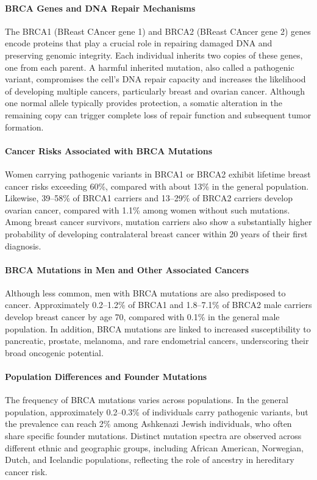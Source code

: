 \documentclass[10pt]{extarticle}
\begin{document}
\paragraph{BRCA Genes and DNA Repair Mechanisms}
The BRCA1 (BReast CAncer gene 1) and BRCA2 (BReast CAncer gene 2) genes encode proteins that play a crucial role in repairing damaged DNA and preserving genomic integrity. Each individual inherits two copies of these genes, one from each parent. A harmful inherited mutation, also called a pathogenic variant, compromises the cell’s DNA repair capacity and increases the likelihood of developing multiple cancers, particularly breast and ovarian cancer. Although one normal allele typically provides protection, a somatic alteration in the remaining copy can trigger complete loss of repair function and subsequent tumor formation.

\paragraph{Cancer Risks Associated with BRCA Mutations}
Women carrying pathogenic variants in BRCA1 or BRCA2 exhibit lifetime breast cancer risks exceeding 60\%, compared with about 13\% in the general population. Likewise, 39–58\% of BRCA1 carriers and 13–29\% of BRCA2 carriers develop ovarian cancer, compared with 1.1\% among women without such mutations. Among breast cancer survivors, mutation carriers also show a substantially higher probability of developing contralateral breast cancer within 20 years of their first diagnosis.

\paragraph{BRCA Mutations in Men and Other Associated Cancers}
Although less common, men with BRCA mutations are also predisposed to cancer. Approximately 0.2–1.2\% of BRCA1 and 1.8–7.1\% of BRCA2 male carriers develop breast cancer by age 70, compared with 0.1\% in the general male population. In addition, BRCA mutations are linked to increased susceptibility to pancreatic, prostate, melanoma, and rare endometrial cancers, underscoring their broad oncogenic potential.

\paragraph{Population Differences and Founder Mutations}
The frequency of BRCA mutations varies across populations. In the general population, approximately 0.2–0.3\% of individuals carry pathogenic variants, but the prevalence can reach 2\% among Ashkenazi Jewish individuals, who often share specific founder mutations. Distinct mutation spectra are observed across different ethnic and geographic groups, including African American, Norwegian, Dutch, and Icelandic populations, reflecting the role of ancestry in hereditary cancer risk.
\end{document}

